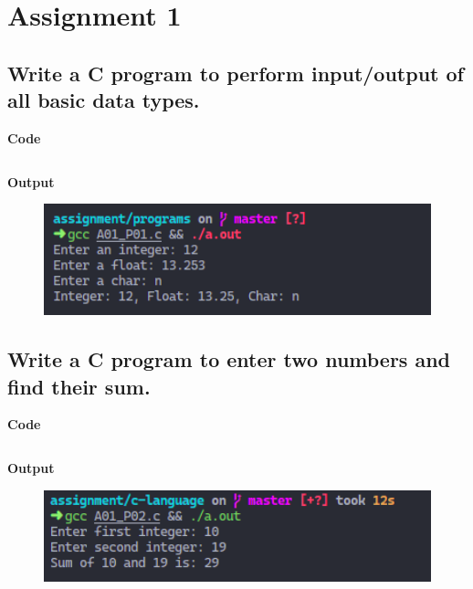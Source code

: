\documentclass[a4paper]{article}
\begin{document}
\tableofcontents
\newpage


\section{Assignment 1}


\subsection{Write a C program to perform input/output of all basic data types.}
\textbf{Code}

\inputminted{C}{programs/A01_P01.c}

\textbf{Output}

\begin{figure}[h]
  \includegraphics[width=12cm]{A01_P01.png}
\end{figure}

\newpage



\subsection{Write a C program to enter two numbers and find their sum.}
\textbf{Code}

\inputminted{C}{programs/A01_P02.c}

\textbf{Output}

\begin{figure}[h]
  \includegraphics[width=12cm]{A01_P02}
\end{figure}

\newpage


\end{document}
